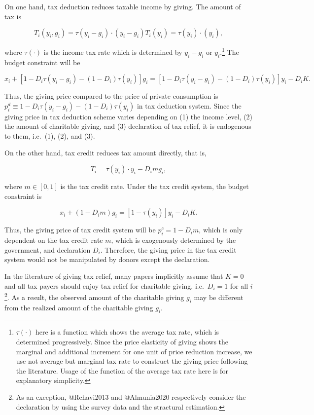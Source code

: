 \documentclass[
  11pt,
  a4paper,
]{article}
\begin{document}
On one hand, tax deduction reduces taxable income by giving. The amount of tax is

\[
    T_i(y_i, g_i) = \tau(y_i - g_i) \cdot (y_i - g_i)
    T_i(y_i) = \tau(y_i) \cdot (y_i),
\]

where \(\tau(\cdot)\) is the income tax rate which is determined by \(y_i - g_i\) or \(y_i\).\footnote{\(\tau(\cdot)\) here is a function which shows the average tax rate, which is determined progressively. Since the price elasticity of giving shows the marginal and additional increment for one unit of price reduction increase, we use not average but marginal tax rate to construct the giving price following the literature. Usage of the function of the average tax rate here is for explanatory simplicity.} The budget constraint will be

\[
    x_i + [1 - D_i\tau(y_i - g_i)-(1-D_i)\tau(y_i)]g_i = [1 - D_i\tau(y_i - g_i)-(1-D_i)\tau(y_i)] y_i− D_iK.
\]

Thus, the giving price compared to the price of private consumption is \(p_i^{d} \equiv 1 - D_i\tau(y_i - g_i)-(1-D_i)\tau(y_i)\) in tax deduction system. Since the giving price in tax deduction scheme varies depending on (1) the income level, (2) the amount of charitable giving, and (3) declaration of tax relief, it is endogenous to them, i.e.~(1), (2), and (3).

On the other hand, tax credit reduces tax amount directly, that is,

\[
    T_i = \tau(y_i)\cdot y_i - D_im g_i ,
\]

where \(m \in [0, 1]\) is the tax credit rate. Under the tax credit system, the budget constraint is

\[
    x_i + (1 - D_im) g_i = [1 - \tau(y_i)] y_i − D_iK.
\]

Thus, the giving price of tax credit system will be \(p_i^c = 1 - D_im\), which is only dependent on the tax credit rate \(m\), which is exogenously determined by the government, and declaration \(D_i\).
Therefore, the giving price in the tax credit system would not be manipulated by donors except the declaration.

In the literature of giving tax relief, many papers implicitly assume that \(K=0\) and all tax payers should enjoy tax relief for charitable giving, i.e.~\(D_i=1\) for all \(i\)\footnote{As an exception, @Rehavi2013 and @Almunia2020 respectively consider the declaration by using the survey data and the stractural estimation.}. As a result, the observed amount of the charitable giving \(g_i\) may be different from the realized amount of the charitable giving \(g_i\).
\end{document}
